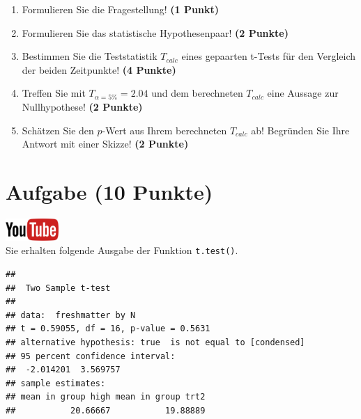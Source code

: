 \documentclass[a4paper, 9pt]{scrartcl}\usepackage[]{graphicx}\usepackage[]{xcolor}
\makeatletter
\newenvironment{kframe}{%
 \def\at@end@of@kframe{}%
 \ifinner\ifhmode%
  \def\at@end@of@kframe{\end{minipage}}%
  \begin{minipage}{\columnwidth}%
 \fi\fi%
 \def\FrameCommand##1{\hskip\@totalleftmargin \hskip-\fboxsep
 \colorbox{shadecolor}{##1}\hskip-\fboxsep
     \hskip-\linewidth \hskip-\@totalleftmargin \hskip\columnwidth}%
 \MakeFramed {\advance\hsize-\width
   \@totalleftmargin\z@ \linewidth\hsize
   \@setminipage}}%
 {\par\unskip\endMakeFramed%
 \at@end@of@kframe}
\newenvironment{knitrout}{}{} %
\makeatother
\begin{document}
\begin{enumerate}
\item Formulieren Sie die Fragestellung! \textbf{(1 Punkt)}
\item Formulieren Sie das statistische Hypothesenpaar! \textbf{(2
    Punkte)}
\item Bestimmen Sie die Teststatistik $T_{calc}$ eines gepaarten t-Tests f{\"u}r den
  Vergleich der beiden Zeitpunkte! \textbf{(4 Punkte)}
\item Treffen Sie mit $T_{\alpha = 5\%} = 2.04$ und dem berechneten $T_{calc}$ eine Aussage
  zur Nullhypothese! \textbf{(2 Punkte)}
\item Sch{\"a}tzen Sie den $p$-Wert aus Ihrem berechneten $T_{calc}$ ab!
  Begr{\"u}nden Sie Ihre Antwort mit einer Skizze! \textbf{(2
    Punkte)}
\end{enumerate} 
\clearpage

\section{Aufgabe \hfill (10 Punkte)}

\hfill\href{https://youtu.be/exDo7AyHl4Q}{\includegraphics[width =
  2cm]{img/youtube}}\\[1Ex]

Sie erhalten folgende \Rlogo Ausgabe der Funktion \texttt{t.test()}.

\begin{knitrout}
\color{fgcolor}\begin{kframe}
\begin{verbatim}
## 
## 	Two Sample t-test
## 
## data:  freshmatter by N
## t = 0.59055, df = 16, p-value = 0.5631
## alternative hypothesis: true  is not equal to [condensed]
## 95 percent confidence interval:
##  -2.014201  3.569757
## sample estimates:
## mean in group high mean in group trt2 
##           20.66667           19.88889
\end{verbatim}
\end{kframe}
\end{knitrout}
\end{document}
